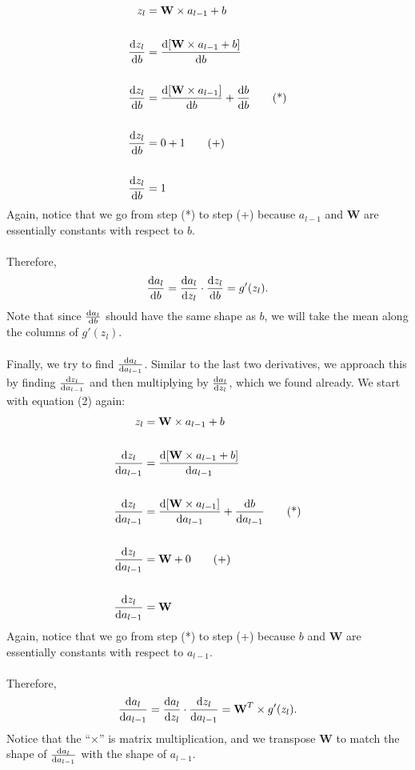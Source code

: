 \documentclass{article}
\begin{document}
\begin{align*}
    z_l &= \textbf{W} \times a_{l-1} + b\\\\
    \diff{z_l}{b} &= \diff{[\textbf{W} \times a_{l-1} + b]}{b}\\\\
    \diff{z_l}{b} &= \diff{[\textbf{W} \times a_{l-1}]}{b} + \diff{b}{b}\tag{*}\\\\
    \diff{z_l}{b} &= 0 + 1\tag{+}\\\\
    \diff{z_l}{b} &= 1
\end{align*}
Again, notice that we go from step (*) to step (+) because $a_{l-1}$ and \textbf{W} are essentially constants with respect to $b$.
\\
\\
Therefore, 
\[\diff{a_l}{b}=\diff{a_l}{z_l}\cdot \diff{z_l}{b} = g'(z_l).\]
Note that since $\diff{a_l}{b}$ should have the same shape as $b$, we will take the mean along the columns of $g'(z_l)$.
\\
\\
Finally, we try to find $\diff{a_l}{a_{l-1}}$. Similar to the last two derivatives, we approach this by finding $\diff{z_l}{a_{l-1}}$ and then multiplying by $\diff{a_l}{z_l}$, which we found already. We start with equation (2) again:
\begin{align*}
    z_l &= \textbf{W} \times a_{l-1} + b\\\\
    \diff{z_l}{a_{l-1}} &= \diff{[\textbf{W} \times a_{l-1} + b]}{a_{l-1}}\\\\
    \diff{z_l}{a_{l-1}} &= \diff{[\textbf{W} \times a_{l-1}]}{a_{l-1}} + \diff{b}{a_{l-1}}\tag{*}\\\\
    \diff{z_l}{a_{l-1}} &= \textbf{W} + 0\tag{+}\\\\
    \diff{z_l}{a_{l-1}} &= \textbf{W}
\end{align*}
Again, notice that we go from step (*) to step (+) because $b$ and \textbf{W} are essentially constants with respect to $a_{l-1}$.
\\
\\
Therefore,
\[\diff{a_l}{a_{l-1}}=\diff{a_l}{z_l}\cdot \diff{z_l}{a_{l-1}} = \textbf{W}^T\times g'(z_l).\]
Notice that the ``$\times$'' is matrix multiplication, and we transpose \textbf{W} to match the shape of $\diff{a_l}{a_{l-1}}$ with the shape of $a_{l-1}$.
\end{document}
